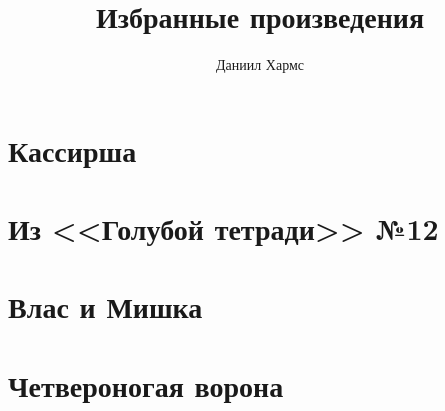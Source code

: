\documentclass[12pt]{book}
\title{Избранные произведения}
\author{Даниил Хармс}
\date{}
\begin{document}
\maketitle

\chapter{Кассирша}


\chapter{Из <<Голубой тетради>> №12}


\chapter{Влас и Мишка}


\chapter{Четвероногая ворона}

\end{document}
